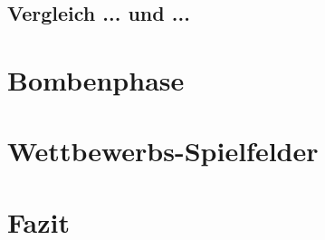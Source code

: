 \documentclass[12pt,a4paper]{article}
\begin{document}
\subsection{Vergleich ... und ...}

\newpage
\section{Bombenphase}

\newpage
\section{Wettbewerbs-Spielfelder}

\newpage
\section{Fazit}
\end{document}
